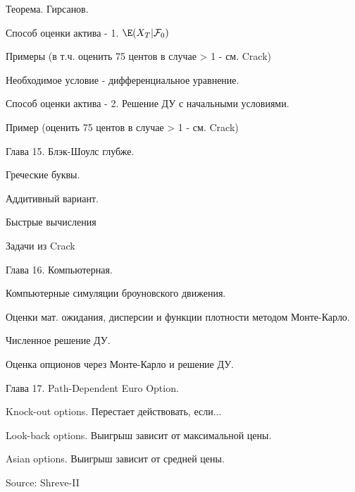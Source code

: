 {Теорема. Гирсанов. \par

Способ оценки актива - 1. $\E(X_{T}|\mathcal{F}_{0})$ \par

Примеры (в т.ч. оценить 75 центов в случае > 1 - см. Crack)

Необходимое условие - дифференциальное уравнение. \par

Способ оценки актива - 2. Решение ДУ с начальными условиями. \par

Пример (оценить 75 центов в случае > 1 - см. Crack)

Глава 15. Блэк-Шоулс глубже. \par
Греческие буквы. \par
Аддитивный вариант. \par
Быстрые вычисления \par
Задачи из Crack \par

Глава 16. Компьютерная. \par
Компьютерные симуляции броуновского движения. \par
Оценки мат. ожидания, дисперсии и функции плотности методом Монте-Карло. \par
Численное решение ДУ. \par
Оценка опционов через Монте-Карло и решение ДУ. \par


Глава 17. Path-Dependent Euro Option. \par
Knock-out options. Перестает действовать, если... \par
Look-back options. Выигрыш зависит от максимальной цены. \par
Asian options. Выигрыш зависит от средней цены. \par

Source: Shreve-II \par





} %
